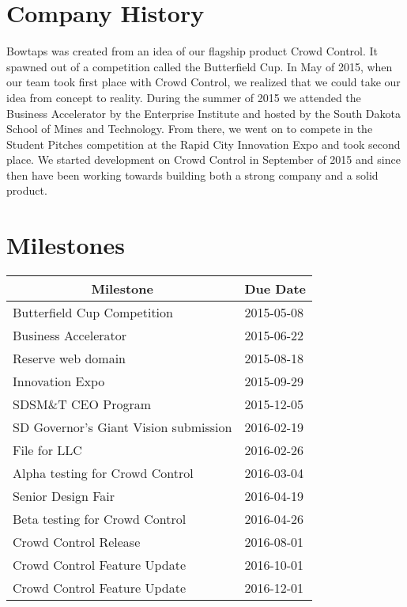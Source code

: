 \section{Company History}

Bowtaps was created from an idea of our flagship product Crowd Control.  It spawned out of a competition called the Butterfield Cup.  In May of 2015, when our team took first place with Crowd Control, we realized that we could take our idea from concept to reality.  During the summer of 2015 we attended the Business Accelerator by the Enterprise Institute and hosted by the South Dakota School of Mines and Technology.  From there, we went on to compete in the Student Pitches competition at the Rapid City Innovation Expo and took second place.  We started development on Crowd Control in September of 2015 and since then have been working towards building both a strong company and a solid product.

\section{Milestones}
\begin{center}
\begin{tabular}{|l |l |}
\hline
\multicolumn{1}{|c|}{\textbf{Milestone}} & \multicolumn{1}{c|}{\textbf{Due Date}}\\
\hline
Butterfield Cup Competition & 2015-05-08\\
\hline
Business Accelerator & 2015-06-22\\
\hline
Reserve web domain & 2015-08-18\\
\hline
Innovation Expo & 2015-09-29\\
\hline
SDSM\&T CEO Program & 2015-12-05\\
\hline
SD Governor's Giant Vision submission & 2016-02-19\\
\hline
File for LLC & 2016-02-26\\
\hline
Alpha testing for Crowd Control & 2016-03-04\\
\hline
Senior Design Fair & 2016-04-19\\
\hline
Beta testing for Crowd Control & 2016-04-26\\
\hline
Crowd Control Release & 2016-08-01\\
\hline
Crowd Control Feature Update & 2016-10-01\\
\hline
Crowd Control Feature Update & 2016-12-01\\
\hline
\end{tabular}
\end{center}
